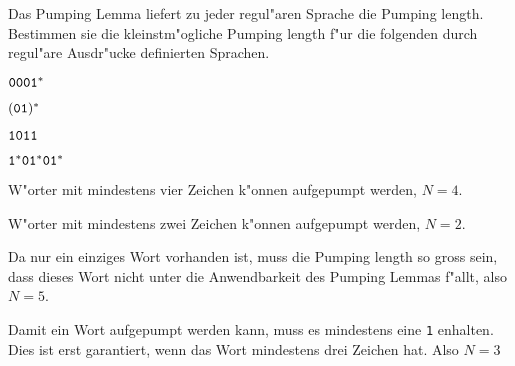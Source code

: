 Das Pumping Lemma liefert zu jeder regul"aren Sprache die Pumping length.
Bestimmen sie die kleinstm"ogliche Pumping length f"ur die folgenden
durch regul"are Ausdr"ucke definierten Sprachen.
\begin{teilaufgaben}
\item ${\tt 0001}^*$
\item $({\tt 01})^*$
\item ${\tt 1011}$
\item ${\tt 1}^*{\tt 01}^*{\tt 01}^*$
\end{teilaufgaben}

\begin{loesung}
\begin{teilaufgaben}
\item W"orter mit mindestens vier Zeichen k"onnen aufgepumpt werden,
$N=4$.
\item W"orter mit mindestens zwei Zeichen k"onnen aufgepumpt werden,
$N=2$.
\item Da nur ein einziges Wort vorhanden ist, muss die Pumping length
so gross sein, dass dieses Wort nicht unter die Anwendbarkeit des
Pumping Lemmas f"allt, also $N=5$.
\item Damit ein Wort aufgepumpt werden kann, muss es mindestens eine
{\tt 1} enhalten. Dies ist erst garantiert, wenn das Wort  mindestens
drei Zeichen hat. Also $N=3$
\end{teilaufgaben}
\end{loesung}
